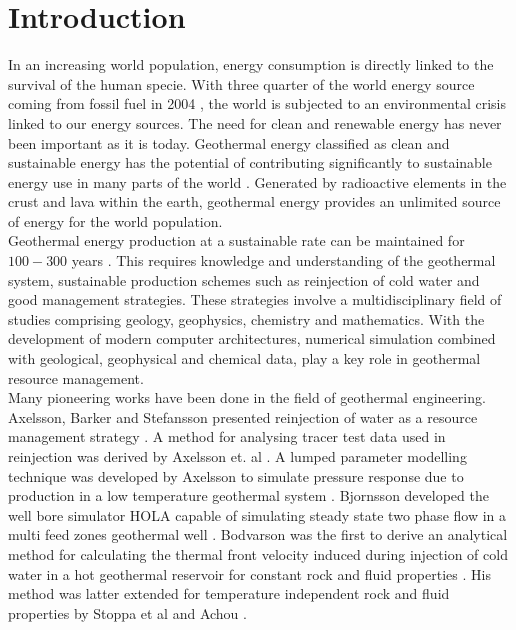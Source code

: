 
\chapter{Introduction} %

\label{Chapter1} %


In an increasing world population, energy consumption is directly linked to the survival of the human specie. 
With three quarter of the world energy source coming from fossil fuel in 2004 \cite{Beretta}, the world is subjected to an environmental crisis linked to our energy sources. The need for clean and renewable energy has never been important as it is today.
Geothermal energy classified as clean and sustainable energy has the potential of contributing significantly to sustainable energy use in many parts of the world \cite{Ax2005}. Generated by radioactive elements in the crust and lava within the earth, geothermal energy provides an unlimited source of energy for the world population. \\

Geothermal energy production at a sustainable rate can be maintained for $100-300$ years \cite{Ax2005, Axelsson2008}. This requires  knowledge and understanding of the geothermal system, sustainable production schemes such as reinjection of cold water and good management strategies. These strategies involve a multidisciplinary field of studies comprising geology, geophysics, chemistry and mathematics. With the development of modern computer architectures, numerical simulation combined with geological, geophysical and chemical data, play a key role in geothermal resource management.\\

Many pioneering works have been done in the field of geothermal engineering. Axelsson, Barker and Stefansson presented reinjection of water as a resource management strategy 
\cite{Ax2005, Axelsson2005, Ax-R08, Barker1995, Stefansson1997}. A method for analysing tracer test data used in reinjection was derived by Axelsson et. al \cite{Axelsson2005}. A lumped parameter modelling technique  was developed by Axelsson to simulate pressure response due to production in a low temperature geothermal system 
\cite{Ax-Rel-Lump05, Ax-Simul-Lump89}. Bjornsson developed the well bore simulator HOLA capable of simulating steady state two phase flow in a multi feed zones geothermal well \cite{Bjornsson1987}. Bodvarson was the first to derive an analytical method for calculating the thermal front velocity induced during injection of cold water in a hot geothermal reservoir for constant rock and fluid properties \cite{Bod-R72}. His method was latter extended for temperature independent rock and fluid properties by Stoppa et al and Achou \cite{Achou2013, Waj05}. \\

